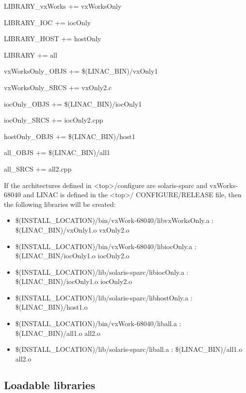 \begin{description}

\item LIBRARY\_vxWorks += vxWorksOnly

\item LIBRARY\_IOC += iocOnly

\item LIBRARY\_HOST += hostOnly

\item LIBRARY += all

\item vxWorksOnly\_OBJS += \$(LINAC\_BIN)/vxOnly1

\item vxWorksOnly\_SRCS += vxOnly2.c

\item iocOnly\_OBJS += \$(LINAC\_BIN)/iocOnly1

\item iocOnly\_SRCS += iocOnly2.cpp

\item hostOnly\_OBJS +=  \$(LINAC\_BIN)/host1

\item all\_OBJS += \$(LINAC\_BIN)/all1

\item all\_SRCS += all2.cpp

\end{description}
If the architectures defined in \textless{}top\textgreater{}/configure are solaris-sparc and vxWorks-68040 and LINAC is defined in the \textless{}top\textgreater{}/
CONFIGURE/RELEASE file, then the following libraries will be created:

\begin{itemize}\item \$(INSTALL\_LOCATION)/bin/vxWork-68040/libvxWorksOnly.a : \$(LINAC\_BIN)/vxOnly1.o vxOnly2.o

\item \$(INSTALL\_LOCATION)/bin/vxWork-68040/libiocOnly.a : \$(LINAC\_BIN/iocOnly1.o iocOnly2.o

\item \$(INSTALL\_LOCATION)/lib/solaris-sparc/libiocOnly.a : \$(LINAC\_BIN)/iocOnly1.o iocOnly2.o

\item \$(INSTALL\_LOCATION)/lib/solaris-sparc/libhostOnly.a : \$(LINAC\_BIN)/host1.o

\item \$(INSTALL\_LOCATION)/bin/vxWork-68040/liball.a : \$(LINAC\_BIN)/all1.o all2.o

\item \$(INSTALL\_LOCATION)/lib/solaris-sparc/liball.a : \$(LINAC\_BIN)/all1.o all2.o

\end{itemize}\subsection{Loadable libraries}

